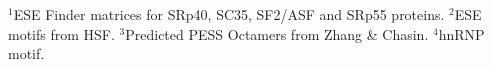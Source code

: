 \documentclass[10pt]{article}
\begin{document}
\begin{table}[!ht]
\begin{tabular}{|l|p{1cm}|p{3cm}|l|l|l|l|}
\end{tabular}
\begin{flushleft}
    $^{1}$ESE Finder matrices for SRp40, SC35, SF2/ASF and SRp55 proteins.
    $^{2}$ESE motifs from HSF.
    $^{3}$Predicted PESS Octamers from Zhang \& Chasin.
    $^{4}$hnRNP motif.
\end{flushleft}
\label{tab:spliceosome}
\end{table}
\end{document}
